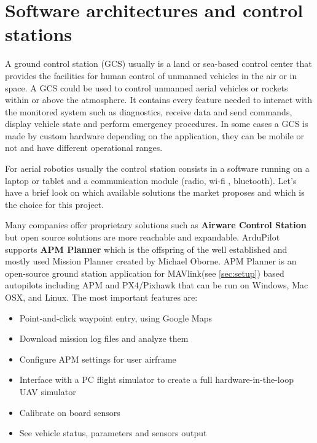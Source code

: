 \section{Software architectures and control stations}

A ground control station (GCS) usually is a land or sea-based control center that provides the facilities for human control of unmanned vehicles in the air or in space. A GCS could be used to control unmanned aerial vehicles or rockets within or above the atmosphere. It contains every feature needed to interact with the monitored system such as diagnostics, receive data and send commands, display vehicle state and perform emergency procedures. In some cases a GCS is made by custom hardware depending on the application, they can be mobile or not and have different operational ranges. \par For aerial robotics usually the control station consists in a software running on a laptop or tablet and a communication module (radio, wi-fi , bluetooth). Let's have a brief look on which available solutions the market proposes and which is the choice for this project. \par 
Many companies offer proprietary solutions such as \textbf{Airware Control Station}  \cite{airware} but open source solutions are more reachable and expandable. ArduPilot supports \textbf{APM Planner} \cite{APMplan} which is the offspring of the well established and mostly used Mission Planner created by Michael Oborne. APM Planner is an open-source ground station application for MAVlink(see \ref{sec:setup}) based autopilots including APM and PX4/Pixhawk that can be run on Windows, Mac OSX, and Linux. The most important features are: \begin{itemize}
\item Point-and-click waypoint entry, using Google Maps
\item Download mission log files and analyze them
\item Configure APM settings for user airframe
\item Interface with a PC flight simulator to create a full hardware-in-the-loop UAV simulator
\item Calibrate on board sensors
\item See vehicle status, parameters and sensors output

\end{itemize}
